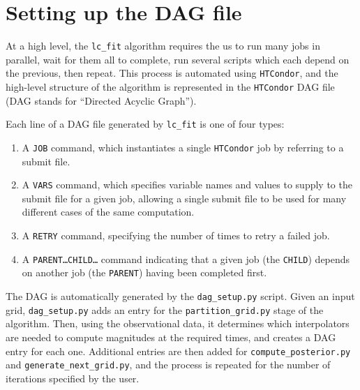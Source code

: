 \documentclass[11pt]{article}
\begin{document}
\section{Setting up the DAG file}

At a high level, the \texttt{lc\_fit} algorithm requires the us to run many jobs in parallel, wait for them all to complete, run several scripts which each depend on the previous, then repeat. This process is automated using \texttt{HTCondor}, and the high-level structure of the algorithm is represented in the \texttt{HTCondor} DAG file (DAG stands for ``Directed Acyclic Graph'').

Each line of a DAG file generated by \texttt{lc\_fit} is one of four types:
\begin{enumerate}
	\item A \texttt{JOB} command, which instantiates a single \texttt{HTCondor} job by referring to a submit file.
	\item A \texttt{VARS} command, which specifies variable names and values to supply to the submit file for a given job, allowing a single submit file to be used for many different cases of the same computation.
	\item 	A \texttt{RETRY} command, specifying the number of times to retry a failed job.
	\item A \texttt{PARENT{\ldots}CHILD{\ldots}} command indicating that a given job (the \texttt{CHILD}) depends on another job (the \texttt{PARENT}) having been completed first.
\end{enumerate}

The DAG is automatically generated by the \texttt{dag\_setup.py} script. Given an input grid, \texttt{dag\_setup.py} adds an entry for the \texttt{partition\_grid.py} stage of the algorithm. Then, using the observational data, it determines which interpolators are needed to compute magnitudes at the required times, and creates a DAG entry for each one. Additional entries are then added for \texttt{compute\_posterior.py} and \texttt{generate\_next\_grid.py}, and the process is repeated for the number of iterations specified by the user.



\end{document}
